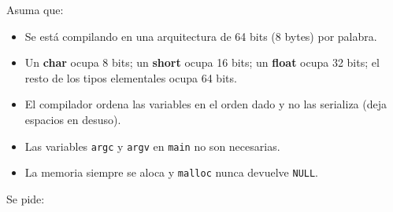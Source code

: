 \documentclass{article}
\begin{document}
Asuma que:
\begin{itemize}
  \setlength{\itemsep}{0pt}
  \setlength{\parskip}{0pt}
  \setlength{\parsep}{0pt}
 \item {Se está compilando en una arquitectura de 64 bits (8 bytes) por palabra.}
 \item {Un {\bf char} ocupa 8 bits; un {\bf short} ocupa 16 bits; un {\bf float} ocupa 32 bits; el resto de los tipos elementales ocupa 64 bits.}
 \item {El compilador ordena las variables en el orden dado y no las serializa (deja espacios en desuso).}
 \item {Las variables \verb!argc! y \verb!argv! en \verb!main! no son necesarias.}
 \item {La memoria siempre se aloca y \verb!malloc! nunca devuelve \verb!NULL!.}
\end{itemize}

Se pide:
\end{document}
